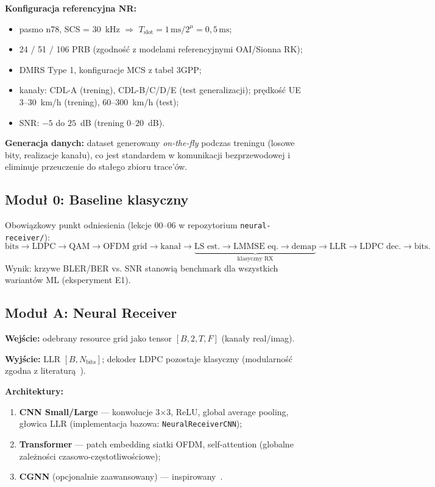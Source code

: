 \documentclass[12pt, a4paper]{article}
\begin{document}
\textbf{Konfiguracja referencyjna NR:}
\begin{itemize}[leftmargin=*]
    \item pasmo n78, SCS = 30~kHz $\Rightarrow$ $T_{\mathrm{slot}} = 1\,\mathrm{ms}/2^{\mu} = 0{,}5\,\mathrm{ms}$;
    \item 24 / 51 / 106 PRB (zgodność z modelami referencyjnymi OAI/Sionna RK);
    \item DMRS Type 1, konfiguracje MCS z tabel 3GPP;
    \item kanały: CDL-A (trening), CDL-B/C/D/E (test generalizacji); prędkość UE 3--30~km/h (trening), 60--300~km/h (test);
    \item SNR: $-5$ do $25$~dB (trening $0$--$20$~dB).
\end{itemize}

\textbf{Generacja danych:} dataset generowany \emph{on-the-fly} podczas treningu (losowe bity, realizacje kanału), co jest standardem w komunikacji bezprzewodowej i eliminuje przeuczenie do stałego zbioru trace'ów.

\subsection{Moduł 0: Baseline klasyczny}

Obowiązkowy punkt odniesienia (lekcje 00--06 w repozytorium \texttt{neural-receiver/}):
\[
\text{bits} \rightarrow \text{LDPC} \rightarrow \text{QAM} \rightarrow \text{OFDM grid} \rightarrow \text{kanał} \rightarrow \underbrace{\text{LS est.} \rightarrow \text{LMMSE eq.} \rightarrow \text{demap}}_{\text{klasyczny RX}} \rightarrow \text{LLR} \rightarrow \text{LDPC dec.} \rightarrow \text{bits}.
\]
Wynik: krzywe BLER/BER vs. SNR stanowią benchmark dla wszystkich wariantów ML (eksperyment E1).

\subsection{Moduł A: Neural Receiver}

\textbf{Wejście:} odebrany resource grid jako tensor $[\mathit{B}, 2, T, F]$ (kanały real/imag).

\textbf{Wyjście:} LLR $[\mathit{B}, N_{\mathrm{bits}}]$; dekoder LDPC pozostaje klasyczny (modularność zgodna z literaturą~\cite{arxiv-2312-02601,arxiv-2409-02912}).

\textbf{Architektury:}
\begin{enumerate}[label=\alph*), leftmargin=*]
    \item \textbf{CNN Small/Large} --- konwolucje 3$\times$3, ReLU, global average pooling, głowica LLR (implementacja bazowa: \texttt{NeuralReceiverCNN});
    \item \textbf{Transformer} --- patch embedding siatki OFDM, self-attention (globalne zależności czasowo-częstotliwościowe);
    \item \textbf{CGNN} (opcjonalnie zaawansowany) --- inspirowany~\cite{arxiv-2312-02601}.
\end{enumerate}
\end{document}
